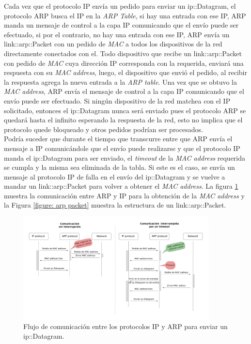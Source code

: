 \documentclass[10pt,a4paper]{article}
\begin{document}
Cada vez que el protocolo IP envía un pedido para enviar un ip::Datagram, el protocolo ARP busca el IP en la \textit{ARP Table}, si hay una entrada con ese IP, ARP manda un mensaje de control a la capa IP comunicando que el envío puede ser efectuado, si por el contrario, no hay una entrada con ese IP, ARP envía un link::arp::Packet con un pedido de \textit{MAC} a todos los dispositivos de la red directamente conectados con el. Todo dispositivo que recibe un link::arp::Packet con pedido de \textit{MAC} cuya dirección IP corresponda con la requerida, enviará una respuesta con su \textit{MAC address}, luego, el dispositivo que envió el pedido, al recibir la respuesta agrega la nueva entrada a la \textit{ARP table}. Una vez que se obtuvo la \textit{MAC address}, ARP envía el mensaje de control a la capa IP comunicando que el envío puede ser efectuado. Si ningún dispositivo de la red matchea con el IP solicitado, entonces el ip::Datagram nunca será enviado pues el protocolo ARP se quedará hasta el infinito esperando la respuesta de la red, esto no implica que el protocolo quede bloqueado y otros pedidos podrían ser procesados.\\

Podría suceder que durante el tiempo que transcurre entre que ARP envía el mensaje a IP comunicándole que el envío puede realizarse y que el protocolo IP manda el ip::Datagram para ser enviado, el \textit{timeout} de la \textit{MAC address} requerida se cumpla y la misma sea eliminada de la tabla. Si este es el caso, se envía un mensaje al protocolo IP de falla en el envío del ip::Datagram y se vuelve a mandar un link::arp::Packet para volver a obtener el \textit{MAC address}. La figura \ref{figure: ARP IP comunication flow} muestra la comunicación entre ARP y IP para la obtención de la \textit{MAC address} y la Figura \ref{figure: arp packet} muestra la estructura de un link::arp::Packet.\\

\begin{figure}[!htb]
    \centering
    \includegraphics[width = 0.9\textwidth]{img/png/ip-arp-comunication.png}
    \caption{Flujo de comunicación entre los protocolos IP y ARP para enviar un ip::Datagram.}
    \label{figure: ARP IP comunication flow}
\end{figure}
\end{document}
